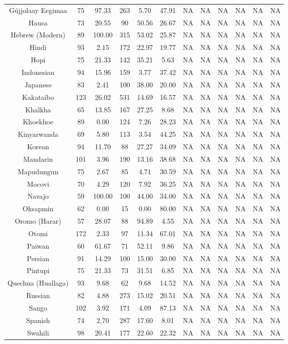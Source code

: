 \begin{tabular}{cccccccccccc}
Gújjolaay Eegimaa & 75 & 97.33 & 263 & 5.70 & 47.91 & NA & NA & NA & NA & NA & NA \\
Hausa & 73 & 20.55 & 90 & 50.56 & 26.67 & NA & NA & NA & NA & NA & NA \\
Hebrew (Modern) & 89 & 100.00 & 315 & 53.02 & 25.87 & NA & NA & NA & NA & NA & NA \\
Hindi & 93 & 2.15 & 172 & 22.97 & 19.77 & NA & NA & NA & NA & NA & NA \\
Hopi & 75 & 21.33 & 142 & 35.21 & 5.63 & NA & NA & NA & NA & NA & NA \\
Indonesian & 94 & 15.96 & 159 & 3.77 & 37.42 & NA & NA & NA & NA & NA & NA \\
Japanese & 83 & 2.41 & 100 & 38.00 & 20.00 & NA & NA & NA & NA & NA & NA \\
Kakataibo & 123 & 26.02 & 531 & 14.69 & 16.57 & NA & NA & NA & NA & NA & NA \\
Khalkha & 65 & 13.85 & 167 & 27.25 & 8.68 & NA & NA & NA & NA & NA & NA \\
Khoekhoe & 89 & 0.00 & 124 & 7.26 & 28.23 & NA & NA & NA & NA & NA & NA \\
Kinyarwanda & 69 & 5.80 & 113 & 3.54 & 44.25 & NA & NA & NA & NA & NA & NA \\
Korean & 94 & 11.70 & 88 & 27.27 & 34.09 & NA & NA & NA & NA & NA & NA \\
Mandarin & 101 & 3.96 & 190 & 13.16 & 38.68 & NA & NA & NA & NA & NA & NA \\
Mapudungun & 75 & 2.67 & 85 & 4.71 & 30.59 & NA & NA & NA & NA & NA & NA \\
Mocovi & 70 & 4.29 & 120 & 7.92 & 36.25 & NA & NA & NA & NA & NA & NA \\
Navajo & 59 & 100.00 & 100 & 44.00 & 34.00 & NA & NA & NA & NA & NA & NA \\
Oksapmin & 62 & 0.00 & 15 & 0.00 & 80.00 & NA & NA & NA & NA & NA & NA \\
Oromo (Harar) & 57 & 28.07 & 88 & 94.89 & 4.55 & NA & NA & NA & NA & NA & NA \\
Otomi & 172 & 2.33 & 97 & 11.34 & 67.01 & NA & NA & NA & NA & NA & NA \\
Paiwan & 60 & 61.67 & 71 & 52.11 & 9.86 & NA & NA & NA & NA & NA & NA \\
Persian & 91 & 14.29 & 100 & 15.00 & 30.00 & NA & NA & NA & NA & NA & NA \\
Pintupi & 75 & 21.33 & 73 & 31.51 & 6.85 & NA & NA & NA & NA & NA & NA \\
Quechua (Huallaga) & 93 & 9.68 & 62 & 9.68 & 14.52 & NA & NA & NA & NA & NA & NA \\
Russian & 82 & 4.88 & 273 & 15.02 & 20.51 & NA & NA & NA & NA & NA & NA \\
Sango & 102 & 3.92 & 171 & 4.09 & 87.13 & NA & NA & NA & NA & NA & NA \\
Spanish & 74 & 2.70 & 287 & 17.60 & 8.01 & NA & NA & NA & NA & NA & NA \\
Swahili & 98 & 20.41 & 177 & 22.60 & 22.32 & NA & NA & NA & NA & NA & NA
\end{tabular}